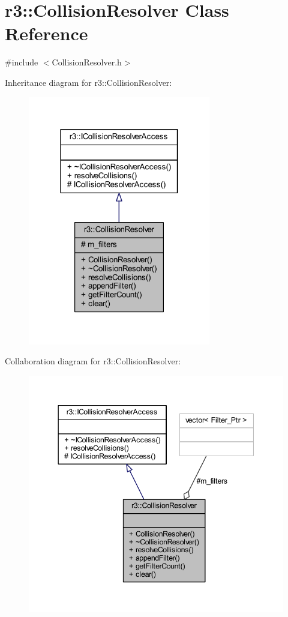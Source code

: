 \hypertarget{classr3_1_1_collision_resolver}{}\section{r3\+:\+:Collision\+Resolver Class Reference}
\label{classr3_1_1_collision_resolver}


{\ttfamily \#include $<$Collision\+Resolver.\+h$>$}



Inheritance diagram for r3\+:\+:Collision\+Resolver\+:\nopagebreak
\begin{figure}[H]
\begin{center}
\leavevmode
\includegraphics[width=226pt]{classr3_1_1_collision_resolver__inherit__graph}
\end{center}
\end{figure}


Collaboration diagram for r3\+:\+:Collision\+Resolver\+:\nopagebreak
\begin{figure}[H]
\begin{center}
\leavevmode
\includegraphics[width=344pt]{classr3_1_1_collision_resolver__coll__graph}
\end{center}
\end{figure}
